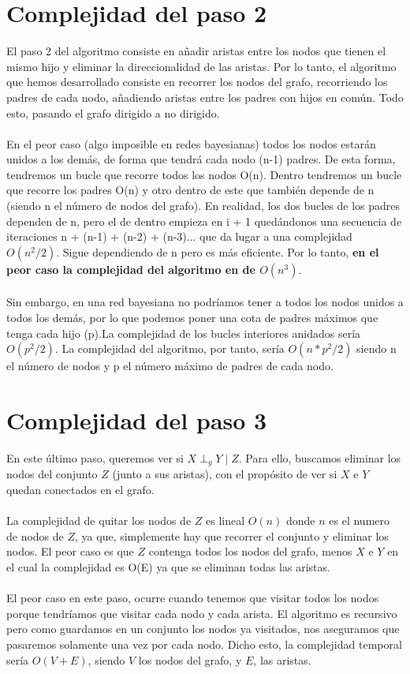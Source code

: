 \documentclass[a4paper,12pt]{article}
\begin{document}
\section{Complejidad del paso 2}
El paso 2 del algoritmo consiste en añadir aristas entre los nodos que tienen el mismo hijo y eliminar la direccionalidad de las aristas. Por lo tanto, el algoritmo que hemos desarrollado consiste en recorrer los nodos del grafo, recorriendo los padres de cada nodo, añadiendo aristas entre los padres con hijos en común. Todo esto, pasando el grafo dirigido a no dirigido. \\ \\
En el peor caso (algo imposible en redes bayesianas) todos los nodos estarán unidos a los demás, de forma que tendrá cada nodo (n-1) padres. De esta forma, tendremos un bucle que recorre todos los nodos O(n). Dentro tendremos un bucle que recorre los padres O(n) y otro dentro de este que también depende de n (siendo n el número de nodos del grafo). En realidad, los dos bucles de los padres dependen de n, pero el de dentro empieza en i + 1 quedándonos una secuencia de iteraciones n + (n-1) + (n-2) + (n-3)... que da lugar a una complejidad $O(n^2/2)$. Sigue dependiendo de n pero es más eficiente. Por lo tanto, \textbf{en el peor caso la complejidad del algoritmo en de $O(n^3)$}. \\ \\ 
Sin embargo, en una red bayesiana no podríamos tener a todos los nodos unidos a todos los demás, por lo que podemos poner una cota de padres máximos que tenga cada hijo (p).La complejidad de los bucles interiores anidados sería $O(p^2/2)$. La complejidad del algoritmo, por tanto, sería $O(n * p^2/2)$ siendo n el número de nodos y p el número máximo de padres de cada nodo.
 
\section{Complejidad del paso 3}
En este último paso, queremos ver si  $X \perp _g Y \mid Z$. Para ello, buscamos eliminar los nodos del conjunto $Z$ (junto a sus aristas), con el propósito de ver si $X$ e $Y$ quedan conectados en el grafo. \\ \\
La complejidad de quitar los nodos de $Z$ es lineal $O(n)$ donde $n$ es el numero de nodos de $Z$, ya que, simplemente hay que recorrer el conjunto y eliminar los nodos. El peor caso es que $Z$ contenga todos los nodos del grafo, menos $X$ e $Y$ en el cual la complejidad es O(E) ya que se eliminan todas las aristas. \\ \\
El peor caso en este paso, ocurre cuando tenemos que visitar todos los nodos porque tendríamos que visitar cada nodo y cada arista. El algoritmo es recursivo pero como guardamos en un conjunto los nodos ya visitados, nos aseguramos que pasaremos solamente una vez por cada nodo. Dicho esto, la complejidad temporal sería  $O(V + E)$, siendo $V$ los nodos del grafo, y $E$, las aristas.
\end{document}
